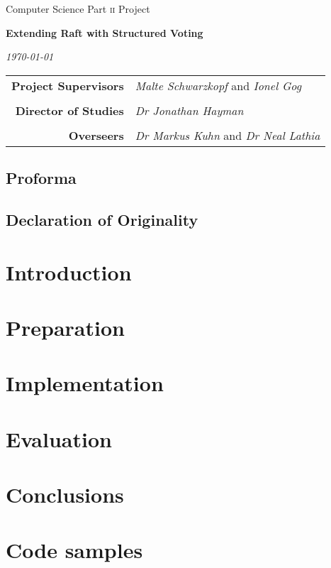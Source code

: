 \documentclass[11pt,chapterprefix=true,toc=bibliography,index,listof]{scrreprt}
\begin{document}
\begin{titlepage}

 \medskip
{} \medskip
{}

\vfil

\centerline{\large Computer Science Part \textsc{ii} Project} \vspace{0.4in}
\centerline{\Large\textbf{Extending Raft with Structured Voting}} \vspace{0.3in}
\centerline{\large\textit{\today}}

\vfil

\begin{center}
\begin{tabularx}{316pt}{rX}
\textbf{Project Supervisors} & \textit{Malte Schwarzkopf} and \textit{Ionel Gog} \\ \\
\textbf{Director of Studies} & \textit{Dr Jonathan Hayman} \\ \\
\textbf{Overseers} & \textit{Dr Markus Kuhn} and \textit{Dr Neal Lathia}
\end{tabularx}
\end{center}

\end{titlepage}

\section*{Proforma%
   \label{proforma}%
}

\section*{Declaration of Originality%
   \label{declaration-of-originality}%
}

\tableofcontents

\chapter{Introduction%
  \label{introduction}%
}

\chapter{Preparation%
  \label{preparation}%
}

\chapter{Implementation%
  \label{implementation}%
}

\chapter{Evaluation%
  \label{evaluation}%
}

\chapter{Conclusions%
  \label{conclusions}%
}




\appendix

\chapter{Code samples%
  \label{code-samples}%
}
\end{document}
